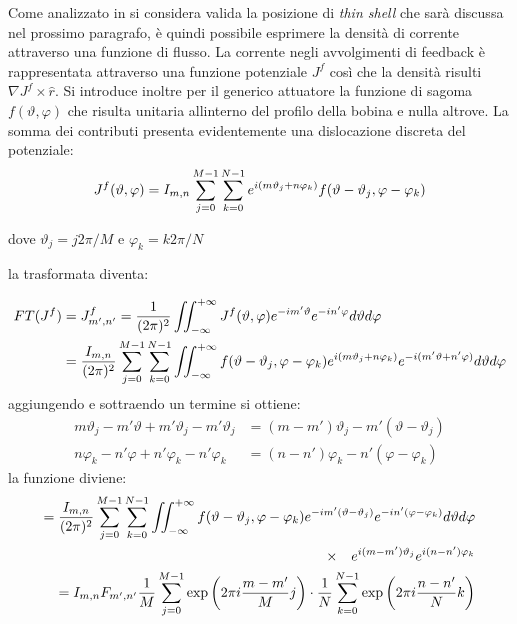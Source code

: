 Come analizzato in \cite{pizz_81} si considera valida la posizione di
\emph{thin shell} che sarà discussa nel prossimo paragrafo, è quindi
possibile esprimere la densità di corrente attraverso una funzione di
flusso.  La corrente negli avvolgimenti di feedback è rappresentata
attraverso una funzione potenziale $J^f$ così che la densità risulti
$\nabla J^f \times \hat{r}$. Si introduce inoltre per il generico
attuatore la funzione di sagoma $f(\vartheta,\varphi)$ che risulta
unitaria allinterno del profilo della bobina e nulla altrove.  La somma
dei contributi presenta evidentemente una dislocazione discreta del
potenziale:
\begin{equation}
 \label{eq:potenziale}
 J^f(\vartheta,\varphi) = I_{m,n} \sum_{j=0}^{M-1} \sum_{k=0}^{N-1}
  e^{ i (m\vartheta_j+n\varphi_k)} f(\vartheta - \vartheta_j,\varphi-\varphi_k)
\end{equation}

dove $\vartheta_j = j2\pi/M$ e $\varphi_k = k2\pi/N$

la trasformata diventa:




\begin{align}
 FT(J^f) &= J^f_{m',n'} = \frac{1}{(2\pi)^2} \iint_{-\infty}^{+\infty} J^f(\vartheta,\varphi)
  e^{-im'\vartheta} e^{-in'\varphi} d\vartheta d\varphi \nonumber \\
 &=\frac{I_{m,n}}{(2\pi)^2}\sum_{j=0}^{M-1} \sum_{k=0}^{N-1}
 \iint_{-\infty}^{+\infty} f(\vartheta - \vartheta_j,\varphi-\varphi_k)
 e^{i(m\vartheta_j+n\varphi_k)} e^{-i(m'\vartheta + n'\varphi)}
 d\vartheta d\varphi  \nonumber
\end{align}
aggiungendo e sottraendo un termine si ottiene:
\begin{align}
 m\vartheta_j - m'\vartheta + m'\vartheta_j - m'\vartheta_j &=
 (m-m')\vartheta_j - m'(\vartheta - \vartheta_j) \nonumber \\
 n\varphi_k - n'\varphi + n'\varphi_k - n'\varphi_k &=
 (n-n')\varphi_k - n'(\varphi - \varphi_k) \nonumber
\end{align}
la funzione diviene:
\begin{align}
 \label{eq:dimostrazione_sideb}
= \frac{I_{m,n}}{(2\pi)^2} \sum_{j=0}^{M-1}\sum_{k=0}^{N-1}
 \iint_{-\infty}^{+\infty} f(\vartheta - \vartheta_j,\varphi-\varphi_k)
 e^{-im'(\vartheta-\vartheta_j)}e^{-in'(\varphi-\varphi_k)}  d\vartheta
 d\varphi \nonumber \\
 \times \quad e^{i(m-m')\vartheta_j}e^{i(n-n')\varphi_k} \nonumber \\
 = I_{m,n} F_{m',n'} \frac1{M} \sum_{j=0}^{M-1} \exp\left(2\pi i
 \frac{m-m'}{M}j \right) \cdot 
 \frac1{N} \sum_{k=0}^{N-1} \exp\left(2\pi i \frac{n-n'}{N}k \right)
\end{align}

